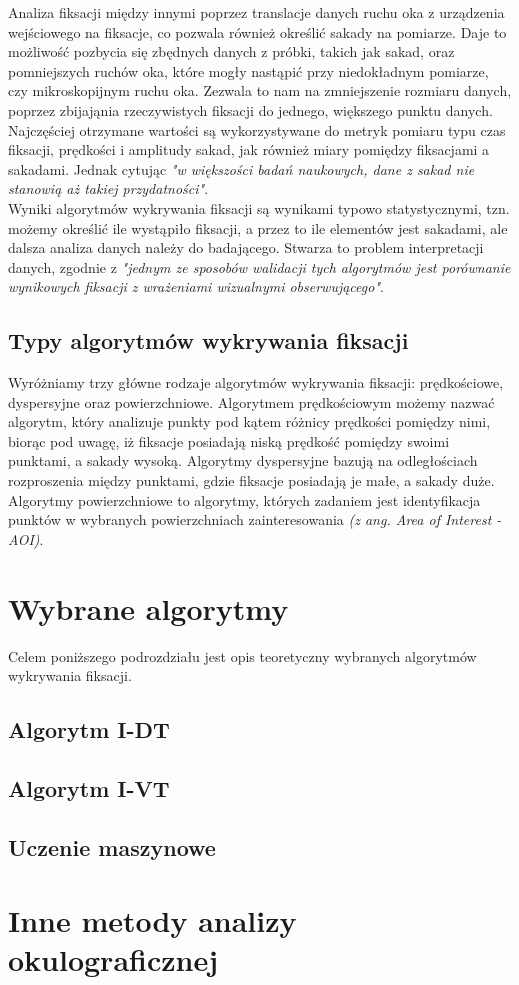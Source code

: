 Analiza fiksacji między innymi poprzez translacje danych ruchu oka z urządzenia wejściowego na fiksacje, co pozwala również określić sakady na pomiarze. Daje to możliwość pozbycia się zbędnych danych z próbki, takich jak sakad, oraz pomniejszych ruchów oka, które mogły nastąpić przy niedokładnym pomiarze, czy mikroskopijnym ruchu oka. Zezwala to nam na zmniejszenie rozmiaru danych, poprzez zbijająnia rzeczywistych fiksacji do jednego, większego punktu danych. Najczęściej otrzymane wartości są wykorzystywane do metryk pomiaru typu czas fiksacji, prędkości i amplitudy sakad, jak również miary pomiędzy fiksacjami a sakadami. Jednak cytując \cite{Main} \emph{"w większości badań naukowych, dane z sakad nie stanowią aż takiej przydatności"}.\\[\baselineskip]
Wyniki algorytmów wykrywania fiksacji są wynikami typowo statystycznymi, tzn. możemy określić ile wystąpiło fiksacji, a przez to ile elementów jest sakadami, ale dalsza analiza danych należy do badającego. Stwarza to problem interpretacji danych, zgodnie z \cite{Main} \emph{"jednym ze sposobów walidacji tych algorytmów jest porównanie wynikowych fiksacji z wrażeniami wizualnymi obserwującego"}.
\subsection{Typy algorytmów wykrywania fiksacji}
Wyróżniamy trzy główne rodzaje algorytmów wykrywania fiksacji: prędkościowe, dyspersyjne oraz powierzchniowe. Algorytmem prędkościowym możemy nazwać algorytm, który analizuje punkty pod kątem różnicy prędkości pomiędzy nimi, biorąc pod uwagę, iż fiksacje posiadają niską prędkość pomiędzy swoimi punktami, a sakady wysoką. Algorytmy dyspersyjne bazują na odległościach rozproszenia między punktami, gdzie fiksacje posiadają je małe, a sakady duże. Algorytmy powierzchniowe to algorytmy, których zadaniem jest identyfikacja punktów w wybranych powierzchniach zainteresowania \textit{(z ang. Area of Interest - AOI)}.
\section{Wybrane algorytmy}
Celem poniższego podrozdziału jest opis teoretyczny wybranych algorytmów wykrywania fiksacji.
\subsection{Algorytm I-DT}
\subsection{Algorytm I-VT}
\subsection{Uczenie maszynowe}
\section{Inne metody analizy okulograficznej}
